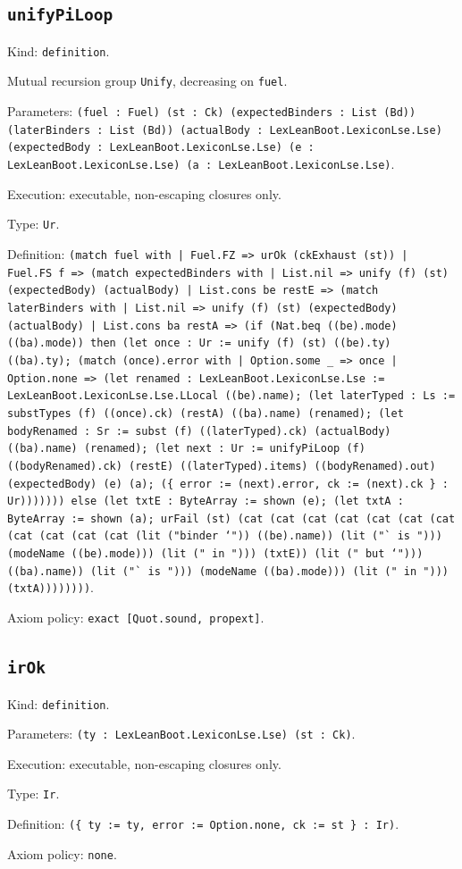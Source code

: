 \documentclass[11pt]{article}
\begin{document}
\subsection*{\texttt{unifyPiLoop}}
\noindent Kind: \texttt{definition}.\par
\noindent Mutual recursion group \texttt{Unify}, decreasing on \texttt{fuel}.\par
\noindent Parameters: \texttt{(fuel : Fuel) (st : Ck) (expectedBinders : List (Bd)) (laterBinders : List (Bd)) (actualBody : LexLeanBoot.LexiconLse.Lse) (expectedBody : LexLeanBoot.LexiconLse.Lse) (e : LexLeanBoot.LexiconLse.Lse) (a : LexLeanBoot.LexiconLse.Lse)}.\par
\noindent Execution: executable, non-escaping closures only.\par
\noindent Type: \texttt{Ur}.\par
\noindent Definition: \texttt{(match fuel with | Fuel.FZ => urOk (ckExhaust (st)) | Fuel.FS f => (match expectedBinders with | List.nil => unify (f) (st) (expectedBody) (actualBody) | List.cons be restE => (match laterBinders with | List.nil => unify (f) (st) (expectedBody) (actualBody) | List.cons ba restA => (if (Nat.beq ((be).mode) ((ba).mode)) then (let once : Ur := unify (f) (st) ((be).ty) ((ba).ty); (match (once).error with | Option.some \_ => once | Option.none => (let renamed : LexLeanBoot.LexiconLse.Lse := LexLeanBoot.LexiconLse.Lse.LLocal ((be).name); (let laterTyped : Ls := substTypes (f) ((once).ck) (restA) ((ba).name) (renamed); (let bodyRenamed : Sr := subst (f) ((laterTyped).ck) (actualBody) ((ba).name) (renamed); (let next : Ur := unifyPiLoop (f) ((bodyRenamed).ck) (restE) ((laterTyped).items) ((bodyRenamed).out) (expectedBody) (e) (a); (\{ error := (next).error, ck := (next).ck \} : Ur))))))) else (let txtE : ByteArray := shown (e); (let txtA : ByteArray := shown (a); urFail (st) (cat (cat (cat (cat (cat (cat (cat (cat (cat (cat (cat (lit ("binder `")) ((be).name)) (lit ("` is "))) (modeName ((be).mode))) (lit (" in "))) (txtE)) (lit (" but `"))) ((ba).name)) (lit ("` is "))) (modeName ((ba).mode))) (lit (" in "))) (txtA))))))))}.\par
\noindent Axiom policy: \texttt{exact [Quot.sound, propext]}.\par
\subsection*{\texttt{irOk}}
\noindent Kind: \texttt{definition}.\par
\noindent Parameters: \texttt{(ty : LexLeanBoot.LexiconLse.Lse) (st : Ck)}.\par
\noindent Execution: executable, non-escaping closures only.\par
\noindent Type: \texttt{Ir}.\par
\noindent Definition: \texttt{(\{ ty := ty, error := Option.none, ck := st \} : Ir)}.\par
\noindent Axiom policy: \texttt{none}.\par
\end{document}
